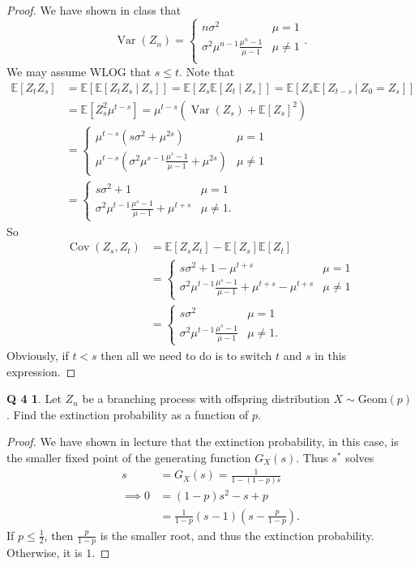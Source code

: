 \documentclass[12pt]{article}
\newcommand{\E}{\mathbb{E}}
\DeclareMathOperator{\Cov}{Cov}
\DeclareMathOperator{\Var}{Var}
\theoremstyle{definition}
\newtheorem*{prob4}{Q 4}
\begin{document}
\begin{proof}
We have shown in class that
$$
\Var(Z_n) = \begin{cases}
       n\sigma^2& \mu = 1 \\
       \sigma^2 \mu^{n-1} \frac{\mu^n - 1}{\mu - 1}& \mu \neq 1 \\
   \end{cases}.
$$
We may assume WLOG that $s \leq t$.  Note that
\begin{align*}
\E[Z_tZ_s] &= \E[\E[Z_tZ_s \ | \ Z_s ]] = \E[ Z_s \E[Z_t \ | \ Z_s ]] = \E[Z_s \E[Z_{t-s} \ | \ Z_0 = Z_s]]
\\
&= \E[Z_s^2 \mu^{t-s}] = \mu^{t-s}(\Var(Z_s) + \E[Z_s]^2)
\\
&= \begin{cases}
\mu^{t-s} ( s\sigma^2 + \mu^{2s}) & \mu = 1 \\
\mu^{t-s}(\sigma^2 \mu^{s-1} \frac{\mu^s - 1}{\mu - 1} + \mu^{2s}) & \mu \neq 1
\end{cases}
\\
&= \begin{cases}
s\sigma^2 + 1 & \mu = 1 \\
\sigma^2 \mu^{t-1} \frac{\mu^s - 1}{\mu - 1} + \mu^{t+s} & \mu \neq 1.
\end{cases}
\end{align*}
So
\begin{align*}
\Cov(Z_s, Z_t) &= \E[Z_sZ_t] - \E[Z_s]\E[Z_t]
\\
&= \begin{cases}
s\sigma^2 + 1 - \mu^{t+s} & \mu = 1 \\
\sigma^2 \mu^{t-1} \frac{\mu^s - 1}{\mu - 1} + \mu^{t+s} - \mu^{t+s} & \mu \neq 1
\end{cases}
\\
&= \begin{cases}
s\sigma^2 & \mu = 1 \\
\sigma^2 \mu^{t-1} \frac{\mu^s - 1}{\mu - 1} & \mu \neq 1.
\end{cases}
\end{align*}
Obviously, if $t<s$ then all we need to do is to switch $t$ and $s$ in this expression.
\end{proof}

\begin{prob4}
Let $Z_n$ be a branching process with offspring distribution $X \sim \text{Geom}(p)$.  Find the extinction probability as a function of $p$.
\end{prob4}

\begin{proof}
We have shown in lecture that the extinction probability, in this case, is the smaller fixed point of the generating function $G_X(s)$.  Thus $s^*$ solves
\begin{align*}
s &= G_X(s) = \frac{1}{1-(1-p)s}
\\
\implies 0 &= (1-p)s^2 - s + p
\\
&= \frac{1}{1-p}(s-1) \left(s-\frac{p}{1-p} \right).
\end{align*}
If $p \leq \frac12$, then $\frac{p}{1-p}$ is the smaller root, and thus the extinction probability.  Otherwise, it is $1$.
\end{proof}
\end{document}
